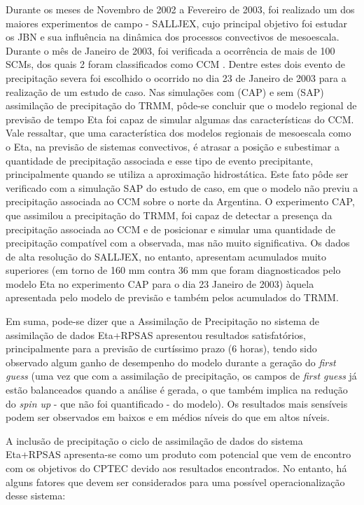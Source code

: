 Durante os meses de Novembro de 2002 a Fevereiro de 2003, foi realizado um dos maiores experimentos de campo - SALLJEX, cujo principal objetivo foi estudar os JBN e sua influência na dinâmica dos processos convectivos de mesoescala. Durante o mês de Janeiro de 2003, foi verificada a ocorrência de mais de 100 SCMs, dos quais 2 foram classificados como CCM \cite{zipseretal04}. Dentre estes dois evento de precipitação severa foi escolhido o ocorrido no dia 23 de Janeiro de 2003 para a realização de um estudo de caso. Nas simulações com (CAP) e sem (SAP) assimilação de precipitação do TRMM, pôde-se concluir que o modelo regional de previsão de tempo Eta foi capaz de simular algumas das características do CCM. Vale ressaltar, que uma característica dos modelos regionais de mesoescala como o Eta, na previsão de sistemas convectivos, é atrasar a posição e subestimar a quantidade de precipitação associada e esse tipo de evento precipitante, principalmente quando se utiliza a aproximação hidrostática. Este fato pôde ser verificado com a simulação SAP do estudo de caso, em que o modelo não previu a precipitação associada ao CCM sobre o norte da Argentina. O experimento CAP, que assimilou a precipitação do TRMM, foi capaz de detectar a presença da precipitação associada ao CCM e de posicionar e simular uma quantidade de precipitação compatível com a observada, mas não muito significativa. Os dados de alta resolução do SALLJEX, no entanto, apresentam acumulados muito superiores (em torno de 160 mm contra 36 mm que foram diagnosticados pelo modelo Eta no experimento CAP para o dia 23 Janeiro de 2003) àquela apresentada pelo modelo de previsão e também pelos acumulados do TRMM.

Em suma, pode-se dizer que a Assimilação de Precipitação no sistema de assimilação de dados Eta+RPSAS apresentou resultados satisfatórios, principalmente para a previsão de curtíssimo prazo (6 horas), tendo sido observado algum ganho de desempenho do modelo durante a geração do \textit{first guess} (uma vez que com a assimilação de precipitação, os campos de \textit{first guess} já estão balanceados quando a análise é gerada, o que também implica na redução do \textit{spin up} - que não foi quantificado - do modelo). Os resultados mais sensíveis podem ser observados em baixos e em médios níveis do que em altos níveis.

A inclusão de precipitação o ciclo de assimilação de dados do sistema Eta+RPSAS apresenta-se como um produto com potencial que vem de encontro com os objetivos do CPTEC devido aos resultados encontrados. No entanto, há alguns fatores que devem ser considerados para uma possível operacionalização desse sistema:

